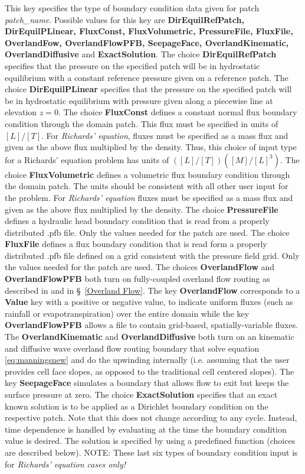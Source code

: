 {This key specifies the type of boundary condition data given for patch
{\em patch\_name}.  Possible values for this key are {\bf DirEquilRefPatch,
DirEquilPLinear, FluxConst, FluxVolumetric, PressureFile, FluxFile, OverlandFow, OverlandFlowPFB, SeepageFace, OverlandKinematic, OverlandDiffusive} and
{\bf ExactSolution}.  The choice {\bf DirEquilRefPatch} specifies that the
pressure on the specified patch will be in hydrostatic equilibrium with a
constant reference pressure given on a reference patch.
The choice {\bf DirEquilPLinear} specifies that the pressure on the specified
patch will be in hydrostatic equilibrium with pressure given along a piecewise
line at elevation $z=0$.  The choice {\bf FluxConst} defines a constant normal
flux boundary condition through the domain patch.
This flux must be specified in units of $[L]/[T]$.
For {\em Richards' equation}, fluxes must be specified as a mass flux and given
as the above flux multiplied by the density.  Thus, this choice of input type
for a Richards' equation problem has units of $([L]/[T])([M]/[L]^3)$.
The choice {\bf FluxVolumetric} defines a volumetric flux boundary condition
through the domain patch.  The units should be consistent with all other
user input for the problem.
For {\em Richards' equation} fluxes must be specified as a mass flux and given
as the above flux multiplied by the density.
The choice {\bf PressureFile} defines a hydraulic head boundary condition that
is read from a properly distributed .pfb file.  Only the values needed for the
patch are used.
The choice {\bf FluxFile} defines a flux boundary condition that is read form a
properly distributed .pfb file defined on a grid consistent with the pressure
field grid.  Only the values needed for the patch are used.
The choices {\bf OverlandFlow} and {\bf OverlandFlowPFB} both turn on
fully-coupled overland flow routing as described in \cite{KM06} and in \S~\ref{Overland Flow}.
The key {\bf OverlandFlow} corresponds to a {\bf Value} key with a positive or negative value,
to indicate uniform fluxes (such as rainfall or evapotranspiration) over the entire domain
while the key {\bf OverlandFlowPFB} allows a  file to contain grid-based,
spatially-variable fluxes. The {\bf OverlandKinematic} and {\bf OverlandDiffusive} both turn on
an kinematic and diffusive wave overland flow routing boundary that solve equation \ref{eq:manningsnew} and do the upwinding internally (i.e. assuming that the user provides cell face slopes, as opposed to the traditional cell centered slopes). The key {\bf SeepageFace} simulates a boundary that allows flow to exit but keeps the surface pressure at zero.
The choice {\bf ExactSolution} specifies that an exact known solution
is to be applied as a
Dirichlet boundary condition on the respective patch.  Note that this does not
change according to any cycle.  Instead, time dependence is handled by
evaluating at the time the boundary condition value is desired.
The solution is specified by using a predefined function (choices are described
below).  NOTE: These last six types of boundary condition input is for
{\em Richards' equation cases only!}
}
